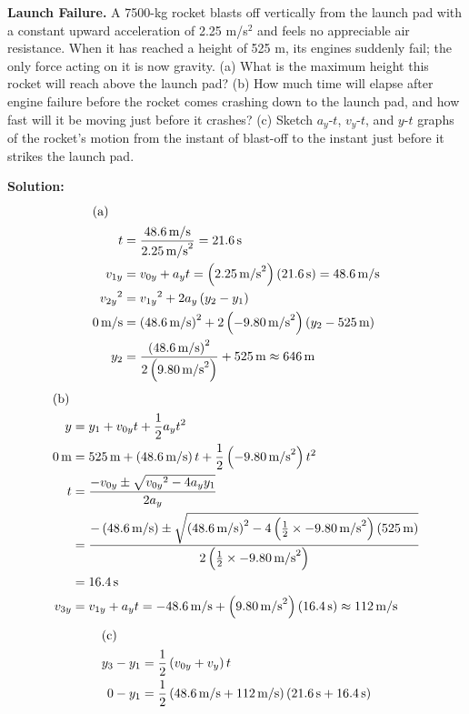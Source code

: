 \documentclass[12pt]{article}
\newenvironment{problem}[2][]{
    \begin{trivlist}
        \item[
            {\bfseries #1}
            {\bfseries #2}
        ]
}{\end{trivlist}}
\newcommand{\solution}{\medskip\noindent\textbf{Solution:}}
\newcommand{\Part}[1]{\shortintertext{(#1)}}
\newcommand{\unit}[1]{\, \text{#1}}
\newcommand{\m}{\unit{m}}
\newcommand{\mps}{\unit{m/s}}
\newcommand{\s}{\unit{s}}
\begin{document}
\begin{problem}{2.43}
    \textbf{Launch Failure.} A 7500-kg rocket blasts off vertically from the launch pad with a constant upward acceleration of 2.25 m/s$^2$ and feels no appreciable air resistance.
    When it has reached a height of 525 m, its engines suddenly fail; the only force acting on it is now gravity.
    (a) What is the maximum height this rocket will reach above the launch pad?
    (b) How much time will elapse after engine failure before the rocket comes crashing down to the launch pad, and how fast will it be moving just before it crashes?
    (c) Sketch $a_y$-$t$, $v_y$-$t$, and $y$-$t$ graphs of the rocket's motion from the instant of blast-off to the instant just before it strikes the launch pad.

    \solution
    \begin{align}
        \Part{a}
        t &= \frac{48.6 \mps}{2.25 \mps^2} = 21.6 \s \\
        v_{1y} &= v_{0y} + a_y t = \left(2.25 \mps^2\right) \left(21.6 \s\right) = 48.6 \mps \\
        {v_{2y}}^2 &= {v_{1y}}^2 + 2 a_y \left(y_2 - y_1\right) \\
        0 \mps &= \left(48.6 \mps\right)^2 + 2 \left(-9.80 \mps^2\right) \left(y_2 - 525 \m\right) \\
        y_2 &= \frac{\left(48.6 \mps\right)^2}{2 \left(9.80 \mps^2\right)} + 525 \m \approx 646 \m
    \end{align}
    \begin{align}
        \Part{b}
        y &= y_1 + v_{0y} t + \frac{1}{2} a_y t^2 \\
        0 \m &= 525 \m + \left(48.6 \mps\right) t + \frac{1}{2} \left(-9.80 \mps^2\right) t^2 \\
        t &= \frac{-v_{0y} \pm \sqrt{{v_{0y}}^2 - 4 a_y y_1}}{2 a_y} \\
        &= \frac{-\left(48.6 \mps\right) \pm \sqrt{\left(48.6 \mps\right)^2 - 4 \left(\frac{1}{2} \times -9.80 \mps^2\right) \left(525 \m\right)}}{2 \left(\frac{1}{2} \times -9.80 \mps^2\right)} \\
        &= 16.4 \s \\
        v_{3y} &= v_{1y} + a_y t = -48.6 \mps + \left(9.80 \mps^2\right) \left(16.4 \s\right) \approx 112 \mps 
    \end{align}
    \begin{align*}
        \Part{c}
        y_3 - y_1 &= \frac{1}{2} \left(v_{0y} + v_y\right) t \\
        0 - y_1 &= \frac{1}{2} \left(48.6 \mps + 112 \mps\right) \left(21.6 \s + 16.4 \s\right) \\

\end{align*}
\end{problem}
\end{document}
